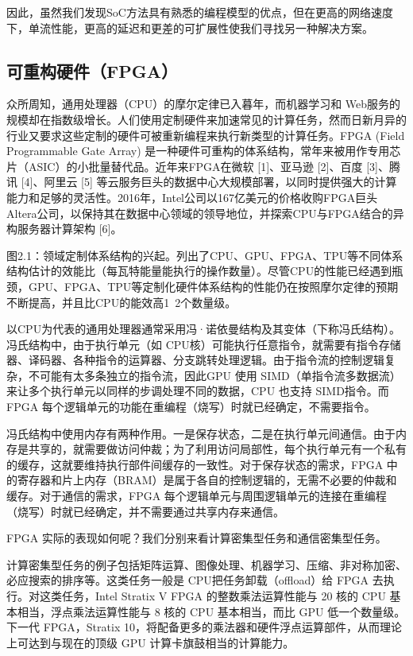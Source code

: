 因此，虽然我们发现SoC方法具有熟悉的编程模型的优点，但在更高的网络速度下，单流性能，更高的延迟和更差的可扩展性使我们寻找另一种解决方案。


\subsection{可重构硬件（FPGA）}
\label{smartnic-fpga}

众所周知，通用处理器（CPU）的摩尔定律已入暮年，而机器学习和 Web服务的规模却在指数级增长。人们使用定制硬件来加速常见的计算任务，然而日新月异的行业又要求这些定制的硬件可被重新编程来执行新类型的计算任务。FPGA (Field Programmable Gate Array) 是一种硬件可重构的体系结构，常年来被用作专用芯片（ASIC）的小批量替代品。近年来FPGA在微软 [1]、亚马逊 [2]、百度 [3]、腾讯 [4]、阿里云 [5] 等云服务巨头的数据中心大规模部署，以同时提供强大的计算能力和足够的灵活性。2016年，Intel公司以167亿美元的价格收购FPGA巨头Altera公司，以保持其在数据中心领域的领导地位，并探索CPU与FPGA结合的异构服务器计算架构 [6]。


图2.1：领域定制体系结构的兴起。列出了CPU、GPU、FPGA、TPU等不同体系结构估计的效能比（每瓦特能量能执行的操作数量）。尽管CPU的性能已经遇到瓶颈，GPU、FPGA、TPU等定制化硬件体系结构的性能仍在按照摩尔定律的预期不断提高，并且比CPU的能效高1~2个数量级。

以CPU为代表的通用处理器通常采用冯·诺依曼结构及其变体（下称冯氏结构）。冯氏结构中，由于执行单元（如 CPU核）可能执行任意指令，就需要有指令存储器、译码器、各种指令的运算器、分支跳转处理逻辑。由于指令流的控制逻辑复杂，不可能有太多条独立的指令流，因此GPU 使用 SIMD（单指令流多数据流）来让多个执行单元以同样的步调处理不同的数据，CPU 也支持 SIMD指令。而 FPGA 每个逻辑单元的功能在重编程（烧写）时就已经确定，不需要指令。

冯氏结构中使用内存有两种作用。一是保存状态，二是在执行单元间通信。由于内存是共享的，就需要做访问仲裁；为了利用访问局部性，每个执行单元有一个私有的缓存，这就要维持执行部件间缓存的一致性。对于保存状态的需求，FPGA 中的寄存器和片上内存（BRAM）是属于各自的控制逻辑的，无需不必要的仲裁和缓存。对于通信的需求，FPGA 每个逻辑单元与周围逻辑单元的连接在重编程（烧写）时就已经确定，并不需要通过共享内存来通信。

FPGA 实际的表现如何呢？我们分别来看计算密集型任务和通信密集型任务。

计算密集型任务的例子包括矩阵运算、图像处理、机器学习、压缩、非对称加密、必应搜索的排序等。这类任务一般是 CPU把任务卸载（offload）给 FPGA 去执行。对这类任务，Intel Stratix V FPGA 的整数乘法运算性能与 20 核的 CPU 基本相当，浮点乘法运算性能与 8 核的 CPU 基本相当，而比 GPU 低一个数量级。下一代 FPGA，Stratix 10，将配备更多的乘法器和硬件浮点运算部件，从而理论上可达到与现在的顶级 GPU 计算卡旗鼓相当的计算能力。

